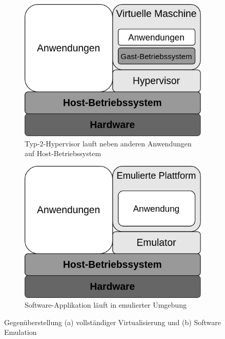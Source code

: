 \begin{figure}[h]
    \begin{subfigure}{0.5\textwidth}
        \includegraphics[width=0.9\linewidth]{anlagen/bilder/volle_Virtualisierung}
        \caption{Typ-2-Hypervisor lauft neben anderen Anwendungen auf
        Host-Betriebssystem}
        \label{fig:Volle_Virtualisierung}
    \end{subfigure}
    \hspace{1ex}
    \begin{subfigure}{0.5\textwidth}
        \includegraphics[width=0.9\linewidth]{anlagen/bilder/Software_Emulation}
        \caption{Software-Applikation läuft in emulierter Umgebung}
        \label{fig:Software_Emulation}
    \end{subfigure}
    \caption{Gegenüberstellung (a) vollständiger
    Virtualisierung\cite{VollVirtAbb_BSKompakt} und (b) Software
    Emulation\cite{SoftEmuAbb_BSKompakt}}
    \label{fig:Comparison_SE_VV}
\end{figure}

